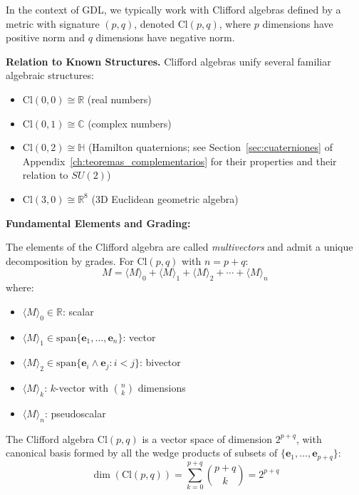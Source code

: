 In the context of \gls{GDL}, we typically work with Clifford algebras defined by a metric with signature $(p,q)$, denoted $\text{Cl}(p,q)$, where $p$ dimensions have positive norm and $q$ dimensions have negative norm.

\textbf{Relation to Known Structures.}\label{rem:clifford_structures} Clifford algebras unify several familiar algebraic structures:
\begin{itemize}
    \item $\text{Cl}(0,0) \cong \mathbb{R}$ (real numbers)
    \item $\text{Cl}(0,1) \cong \mathbb{C}$ (complex numbers)
    \item $\text{Cl}(0,2) \cong \mathbb{H}$ (Hamilton quaternions; see Section~\ref{sec:cuaterniones} of Appendix~\ref{ch:teoremas_complementarios} for their properties and their relation to $SU(2)$)
    \item $\text{Cl}(3,0) \cong \mathbb{R}^{8}$ (3D Euclidean geometric algebra)
\end{itemize}

\textbf{Fundamental Elements and Grading:}

\begin{definition}\label{def:multivector_cnn}
The elements of the Clifford algebra are called \textit{multivectors} and admit a unique decomposition by grades. For $\text{Cl}(p,q)$ with $n = p+q$:
\[M = \langle M \rangle_0 + \langle M \rangle_1 + \langle M \rangle_2 + \cdots + \langle M \rangle_n\]
where:
\begin{itemize}
    \item $\langle M \rangle_0 \in \mathbb{R}$: scalar
    \item $\langle M \rangle_1 \in \text{span}\{\mathbf{e}_1, \ldots, \mathbf{e}_n\}$: vector
    \item $\langle M \rangle_2 \in \text{span}\{\mathbf{e}_i \wedge \mathbf{e}_j : i < j\}$: bivector
    \item $\langle M \rangle_k$: $k$-vector with $\binom{n}{k}$ dimensions
    \item $\langle M \rangle_n$: pseudoscalar
\end{itemize}
\end{definition}

\begin{theorem}\label{thm:dim_clifford_cnn}
The Clifford algebra $\text{Cl}(p,q)$ is a vector space of dimension $2^{p+q}$, with canonical basis formed by all the wedge products of subsets of $\{\mathbf{e}_1, \ldots, \mathbf{e}_{p+q}\}$:
\[\dim(\text{Cl}(p,q)) = \sum_{k=0}^{p+q} \binom{p+q}{k} = 2^{p+q}\]
\end{theorem}

